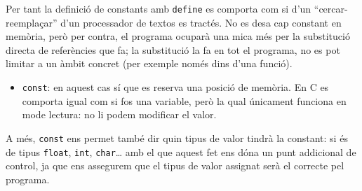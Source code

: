 \documentclass[]{book}
\newenvironment{Shaded}{\begin{snugshade}}{\end{snugshade}}
\newcommand{\DataTypeTok}[1]{\textcolor[rgb]{0.13,0.29,0.53}{#1}}
\newcommand{\DecValTok}[1]{\textcolor[rgb]{0.00,0.00,0.81}{#1}}
\newcommand{\CharTok}[1]{\textcolor[rgb]{0.31,0.60,0.02}{#1}}
\newcommand{\SpecialCharTok}[1]{\textcolor[rgb]{0.00,0.00,0.00}{#1}}
\newcommand{\StringTok}[1]{\textcolor[rgb]{0.31,0.60,0.02}{#1}}
\newcommand{\ImportTok}[1]{#1}
\newcommand{\ControlFlowTok}[1]{\textcolor[rgb]{0.13,0.29,0.53}{\textbf{#1}}}
\newcommand{\PreprocessorTok}[1]{\textcolor[rgb]{0.56,0.35,0.01}{\textit{#1}}}
\newcommand{\NormalTok}[1]{#1}
\providecommand{\tightlist}{%
  \setlength{\itemsep}{0pt}\setlength{\parskip}{0pt}}
\begin{document}
\begin{Shaded}
\end{Shaded}

Per tant la definició de constants amb \texttt{define} es comporta com
si d'un ``cercar-reemplaçar'' d'un processador de textos es tractés. No
es desa cap constant en memòria, però per contra, el programa ocuparà
una mica més per la substitució directa de referències que fa; la
substitució la fa en tot el programa, no es pot limitar a un àmbit
concret (per exemple només dins d'una funció).

\begin{itemize}
\tightlist
\item
  \texttt{const}: en aquest cas sí que es reserva una posició de
  memòria. En C es comporta igual com si fos una variable, però la qual
  únicament funciona en mode lectura: no li podem modificar el valor.
\end{itemize}

A més, \texttt{const} ens permet també dir quin tipus de valor tindrà la
constant: si és de tipus \texttt{float}, \texttt{int},
\texttt{char}\ldots{} amb el que aquest fet ens dóna un punt addicional
de control, ja que ens assegurem que el tipus de valor assignat serà el
correcte pel programa.
\end{document}
